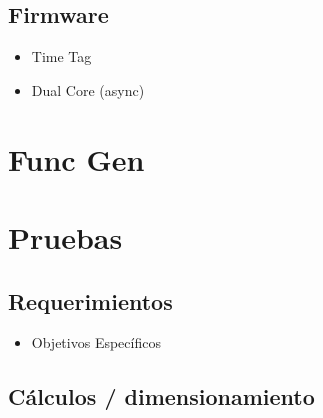 \documentclass[11pt]{article}
\begin{document}
\subsection{Firmware}
\label{sec:org2241cf8}
\begin{itemize}
\item Time Tag\\
\item Dual Core (async)\\
\end{itemize}
\section{Func Gen}
\label{sec:org0d839e1}
\section{Pruebas}
\label{sec:orgf9f9a02}
\subsection{Requerimientos}
\label{sec:orgc99d3b2}
\begin{itemize}
\item Objetivos Específicos\\
\end{itemize}
\subsection{Cálculos / dimensionamiento}
\label{sec:org3094a9b}
\end{document}
